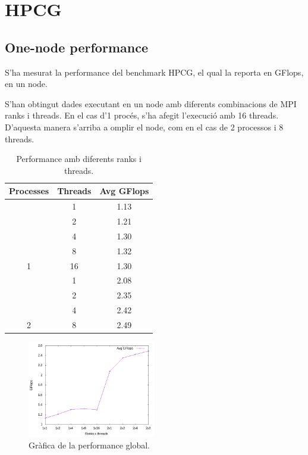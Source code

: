 \section{HPCG}
\subsection{One-node performance}
S'ha mesurat la performance del benchmark HPCG, el qual la reporta en GFlops, en un node. 

S'han obtingut dades executant en un node amb diferents combinacions de MPI ranks i threads. En el cas d'1 procés, s'ha afegit l'execució amb 16 threads. D'aquesta manera s'arriba a omplir el node, com en el cas de 2 processos i 8 threads.

\begin{table}[]
    \centering
\begin{tabular}{ccc}
    \hline
    Processes           & Threads                    & Avg GFlops                   \\ \hline \hline
                        & \cellcolor[HTML]{EFEFEF}1  & \cellcolor[HTML]{EFEFEF}1.13 \\
                        & 2                          & 1.21                         \\
                        & \cellcolor[HTML]{EFEFEF}4  & \cellcolor[HTML]{EFEFEF}1.30 \\
                        & 8                          & 1.32                         \\
    \multirow{-5}{*}{1} & \cellcolor[HTML]{EFEFEF}16 & \cellcolor[HTML]{EFEFEF}1.30 \\ \hline
                        & 1                          & 2.08                         \\
                        & \cellcolor[HTML]{EFEFEF}2  & \cellcolor[HTML]{EFEFEF}2.35 \\
                        & 4                          & 2.42                         \\
    \multirow{-4}{*}{2} & \cellcolor[HTML]{EFEFEF}8  & \cellcolor[HTML]{EFEFEF}2.49 \\ \hline
    \end{tabular}
    \caption{Performance amb diferents ranks i threads.}
    \label{tab:hpcg_global_perf}
\end{table}

\begin{figure}
    \centering
    \includegraphics[width=0.5\textwidth]{img/hpcg_global_grafica.png}
    \caption{Gràfica de la performance global.}
    \label{fig:hpcg_global_perf}
\end{figure}

